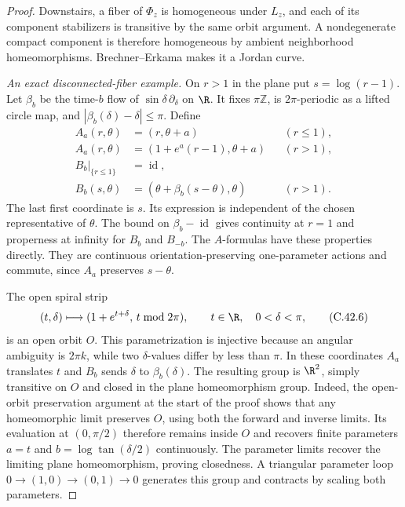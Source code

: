 \begin{proof}
Downstairs, a fiber of $\Phi_z$ is homogeneous
under $L_z$, and each of its component
stabilizers is transitive by the same
orbit argument. A nondegenerate compact
component is therefore homogeneous by
ambient neighborhood homeomorphisms.
Brechner--Erkama
\cite[Theorem 2]{C_BrechnerErkama1979}
makes it a Jordan curve.

\emph{An exact disconnected-fiber example.}
On $r>1$ in the plane put $s=\log(r-1)$.
Let $\beta_b$ be the time-$b$ flow of
$\sin\delta\,\partial_\delta$ on $\R$.
It fixes $\pi\mathbb Z$, is $2\pi$-periodic
as a lifted circle map, and
$|\beta_b(\delta)-\delta|\leq\pi$.
Define
\[
\begin{aligned}
 A_a(r,\theta)&=(r,\theta+a) &&(r\leq1),\\
 A_a(r,\theta)&=(1+e^a(r-1),\theta+a)&&(r>1),\\
 B_b|_{\{r\leq1\}}&=\operatorname{id},\\
 B_b(s,\theta)&=(\theta+\beta_b(s-\theta),\theta)&&(r>1).
\end{aligned}
                                                        \tag{C.42.5}
\]
The last first coordinate is $s$.
Its expression is independent of the chosen
representative of $\theta$.
The bound on $\beta_b-\operatorname{id}$
gives continuity at $r=1$ and properness at
infinity for $B_b$ and $B_{-b}$.
The $A$-formulas have these properties directly.
They are continuous orientation-preserving
one-parameter actions and commute, since
$A_a$ preserves $s-\theta$.

The open spiral strip
\[
 (t,\delta)\longmapsto
  (1+e^{t+\delta},\,t\bmod2\pi),
 \qquad t\in\R,\quad0<\delta<\pi,
                                                        \tag{C.42.6}
\]
is an open orbit $O$. This parametrization is
injective because an angular ambiguity is
$2\pi k$, while two $\delta$-values differ
by less than $\pi$.
In these coordinates $A_a$ translates $t$
and $B_b$ sends $\delta$ to $\beta_b(\delta)$.
The resulting group is $\R^2$, simply
transitive on $O$ and closed in the plane
homeomorphism group. Indeed, the open-orbit
preservation argument at the start of the proof
shows that any homeomorphic limit preserves
$O$, using both the forward and inverse limits.
Its evaluation at $(0,\pi/2)$ therefore remains
inside $O$ and recovers finite parameters
$a=t$ and $b=\log\tan(\delta/2)$ continuously.
The parameter limits recover the limiting
plane homeomorphism, proving closedness.
A triangular parameter loop
$0\to(1,0)\to(0,1)\to0$ generates this
group and contracts by scaling both parameters.


\end{proof}
